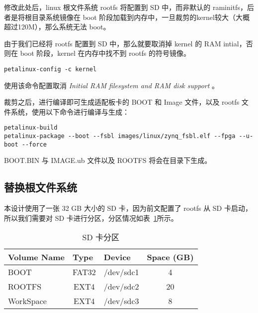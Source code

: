 修改此处后，linux 根文件系统 rootfs 将配置到 SD 中，而非默认的  raminitfs，后者是将根目录系统镜像在 boot 阶段加载到内存中，一旦裁剪的kernel较大（大概超过120M），那么系统无法 boot。

由于我们已经将 rootfs 配置到 SD 中，那么就要取消掉 kernel 的 RAM intial，否则在 boot 阶段，kernel 在内存中找不到 rootfs 的符号镜像。

\begin{lstlisting}
petalinux-config -c kernel
\end{lstlisting}

使用该命令配置取消 \emph{Initial RAM filesystem and RAM disk support} 。

裁剪之后，进行编译即可生成适配板卡的 BOOT 和 Image 文件，以及 rootfs 文件系统，使用以下命令进行编译与生成：

\begin{lstlisting}
petalinux-build
petalinux-package --boot --fsbl images/linux/zynq_fsbl.elf --fpga --u-boot --force
\end{lstlisting}

BOOT.BIN 与 IMAGE.ub 文件以及 ROOTFS 将会在目录下生成。

\subsection{替换根文件系统}

本设计使用了一张 32 GB 大小的 SD 卡，因为前文配置了 rootfs 从 SD 卡启动，所以我们需要对 SD 卡进行分区，分区情况如表~\ref{tab:SD Card Partition}所示。

\begin{table}[!htbp]
    \caption{SD 卡分区}
    \label{tab:SD Card Partition}
    \centering
    \footnotesize%
    \setlength{\tabcolsep}{4pt}%
    \renewcommand{\arraystretch}{1.2}%
    \begin{tabular}{lccc}
        \toprule
        \textbf{Volume Name} & \multicolumn{1}{l}{\textbf{Type}} & \multicolumn{1}{l}{\textbf{Device}} & \multicolumn{1}{l}{\textbf{Space (GB)}} \\
        \midrule
        BOOT                 & FAT32                             & /dev/sdc1                                & 4                                \\
        ROOTFS               & EXT4                              & /dev/sdc2                                & 20                               \\
        WorkSpace            & EXT4                              & /dev/sdc3                                & 8                                \\
        \bottomrule                   
    \end{tabular}
\end{table}

